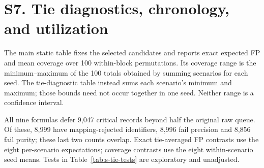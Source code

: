\section*{S7. Tie diagnostics, chronology, and utilization}
The main static table fixes the selected candidates and reports exact expected FP and mean coverage over 100 within-block permutations. Its coverage range is the minimum--maximum of the 100 totals obtained by summing scenarios for each seed. The tie-diagnostic table instead sums each scenario's minimum and maximum; those bounds need not occur together in one seed. Neither range is a confidence interval.

\begin{tableorg}[htbp]
\centering\small
\caption{Complete tie diagnostics at $k=100$. Tied is the median percentage of top-100 positions inside tied blocks; Crossed counts scenarios with a tied block crossing rank 100. Cutoff block and From block are median block size and selected members. Sum of extrema adds per-scenario coverage minima and maxima over 100 permutations. These bounds need not occur together in one seed; they differ from the aggregate seed ranges in the main static table. FP columns are medians across scenarios; Expected FP uses exact within-block expectations.}
\label{tab:s-ties-full}
\resizebox{\textwidth}{!}{}
\end{tableorg}
\begin{tableorg}[htbp]
\centering\small
\caption{Distinct finite score values per scenario for the nine class-level formulas.}
\label{tab:s-distinct}
\resizebox{\textwidth}{!}{}
\end{tableorg}

All nine formulas defer 9,047 critical records beyond half the original raw queue. Of these, 8,999 have mapping-rejected identifiers, 8,996 fail precision and 8,856 fail purity; these last two counts overlap. Exact tie-averaged FP contrasts use the eight per-scenario expectations; coverage contrasts use the eight within-scenario seed means. Tests in Table~\ref{tab:s-tie-tests} are exploratory and unadjusted.

\begin{tableorg}[htbp]
\centering\small
\caption{Scenario-paired exploratory static contrasts under random ties.}
\label{tab:s-tie-tests}
\resizebox{\textwidth}{!}{}
\end{tableorg}

